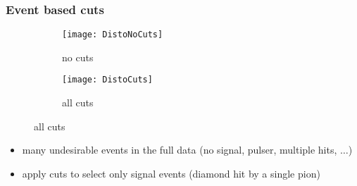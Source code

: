 \begin{frame}
	\frametitle{Event based cuts}
	\vspace*{-7pt}
	\begin{figure} 
		\begin{center}
			\begin{subfigure}{0.45\textwidth}  
				\centering 
				\texttt{[image: DistoNoCuts]}
				\caption{no cuts}
			\end{subfigure}
			\ra
			\begin{subfigure}{0.45\textwidth} 
				\centering 
				\texttt{[image: DistoCuts]}
				\caption{all cuts} 	
			\end{subfigure} 
		\end{center}
	\end{figure}
	\vspace*{-7pt}
	\begin{itemize}
		\setlength{\itemsep}{\fill}
		\item many undesirable events in the full data (no signal, pulser, multiple hits, $\hdots$)
		\item apply cuts to select only signal events (diamond hit by a single pion)
	\end{itemize}
\end{frame}
